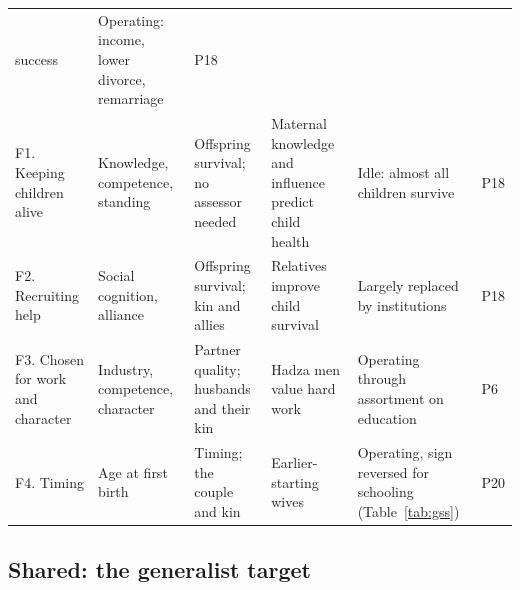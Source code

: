 \begin{table}[t]
\begin{tabularx}{\textwidth}{@{}P{0.135\textwidth}P{0.16\textwidth}P{0.115\textwidth}LP{0.19\textwidth}P{0.05\textwidth}@{}}
success~\cite{borgerhoffmulder2019} & Operating: income, lower divorce, remarriage~\cite{hopcroft2021} & P18\\
\addlinespace
F1. Keeping children alive & Knowledge, competence, standing & Offspring survival; no assessor needed & Maternal knowledge and
influence predict child health~\cite{mcdade2007,alami2020} & Idle: almost all children survive & P18\\
F2. Recruiting help & Social cognition, alliance & Offspring survival; kin and allies & Relatives improve child
survival~\cite{sear2008} & Largely replaced by institutions & P18\\
F3. Chosen for work and character & Industry, competence, character & Partner quality; husbands and their kin & Hadza men value
hard work~\cite{marlowe2004} & Operating through assortment on education~\cite{horwitz2023} & P6\\
F4. Timing & Age at first birth & Timing; the couple and kin & Earlier-starting wives~\cite{vonrueden2011} & Operating, sign
reversed for schooling (Table~\ref{tab:gss}) & P20\\
\bottomrule
\end{tabularx}
\end{table}

\subsection{Shared: the generalist target}


